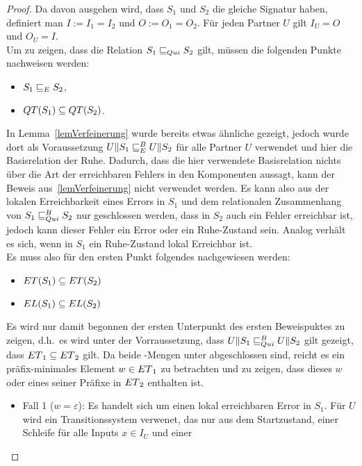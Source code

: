 \begin{proof}
  Da davon ausgehen wird, dass $S_1$ und $S_2$ die gleiche Signatur haben,
  definiert man $I:=I_1=I_2$ und $O:=O_1=O_2$. Für jeden Partner $U$ gilt
  $I_U=O$ und $O_U=I$.\\
  Um zu zeigen, dass die Relation $S_1\sqsubseteq _{Qui} S_2$ gilt, müssen die
  folgenden Punkte nachweisen werden:
  \begin{itemize}
    \item $S_1\sqsubseteq _E S_2$,
    \item $QT{}(S_1)\subseteq QT{}(S_2)$.
  \end{itemize}
  In Lemma~\ref{lemVerfeinerung} wurde bereits etwas ähnliche gezeigt, jedoch
  wurde dort als Voraussetzung $U\|S_1\sqsubseteq _E^B U\|S_2$ für alle Partner $U$
  verwendet und hier die Basisrelation der Ruhe. Dadurch, dass die hier
  verwendete Basisrelation nichts über die Art der erreichbaren Fehlers in den
  Komponenten aussagt, kann der Beweis aus~\ref{lemVerfeinerung} nicht
  verwendet werden. Es kann also aus der lokalen Erreichbarkeit eines Errors in
  $S_1$ und dem relationalen Zusammenhang von $S_1\sqsubseteq _{Qui}^B S_2$ nur geschlossen
  werden, dass in $S_2$ auch ein Fehler erreichbar ist, jedoch kann dieser
  Fehler ein Error oder ein Ruhe-Zustand sein. Analog verhält es sich, wenn in
  $S_1$ ein Ruhe-Zustand lokal Erreichbar ist.\\
  Es muss also für den ersten Punkt folgendes nachgewiesen werden:
  \begin{itemize}
    \item $ET{}(S_1)\subseteq ET{}(S_2)$
    \item $EL{}(S_1)\subseteq EL{}(S_2)$
  \end{itemize}
  Es wird nur damit begonnen der ersten Unterpunkt des ersten Beweispuktes zu
  zeigen, d.h.\ es wird unter der Vorraussetzung, dass $U\|S_1\sqsubseteq _{Qui}^B U\|S_2$
  gilt gezeigt, dass $ET{}_1\subseteq ET{}_2$ gilt. Da beide \ET{}-Mengen
  unter \cont{} abgeschlossen sind, reicht es ein präfix-minimales Element
  $w\in ET{}_1$ zu betrachten und zu zeigen, dass dieses $w$ oder eines seiner
  Präfixe in $ET{}_2$ enthalten ist.
  \begin{itemize}
    \item Fall 1 ($w=\varepsilon$): Es handelt sich um einen lokal erreichbaren
      Error in $S_1$. Für $U$ wird ein Transitionssystem verwenet, das nur aus
      dem Startzustand, einer Schleife für alle Inputs $x\in I_U$ und einer

\end{itemize}
\end{proof}
